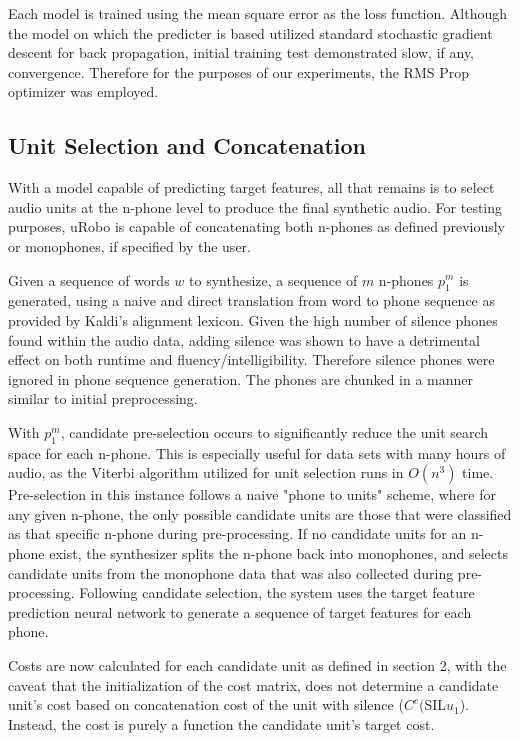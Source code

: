 \documentclass[10pt, journal, compsoc]{IEEEtran}
\begin{document}
Each model is trained using the mean square error as the loss function. Although the model on which the predicter is based utilized standard stochastic gradient descent\cite{unknowndnn} for back propagation, initial training test demonstrated slow, if any, convergence. Therefore for the purposes of our experiments, the RMS Prop optimizer was employed.\par
\subsection{Unit Selection and Concatenation}
With a model capable of predicting target features, all that remains is to select audio units at the n-phone level to produce the final synthetic audio. For testing purposes, uRobo is capable of concatenating both n-phones as defined previously or monophones, if specified by the user.\par 
Given a sequence of words $w$ to synthesize, a sequence of $m$ n-phones $p_1^m$ is generated, using a naive and direct translation from word to phone sequence as provided by Kaldi's alignment lexicon. Given the high number of silence phones found within the audio data, adding silence was shown to have a detrimental effect on both runtime and fluency/intelligibility. Therefore silence phones were ignored in phone sequence generation. The phones are chunked in a manner similar to initial preprocessing.\par 
With $p_1^m$, candidate pre-selection occurs to significantly reduce the unit search space for each n-phone. This is especially useful for data sets with many hours of audio, as the Viterbi algorithm utilized for unit selection runs in $O(n^3)$ time. Pre-selection in this instance follows a naive "phone to units" scheme, where for any given n-phone, the only possible candidate units are those that were classified as that specific n-phone during pre-processing. If no candidate units for an n-phone exist, the synthesizer splits the n-phone back into monophones, and selects candidate units from the monophone data that was also collected during pre-processing. Following candidate selection, the system uses the target feature prediction neural network to generate a sequence of target features for each phone.\par 
Costs are now calculated for each candidate unit as defined in section 2, with the caveat that the initialization of the cost matrix, does not determine a candidate unit's cost based on concatenation cost of the unit with silence ($C^c($SIL$u_1$). Instead, the cost is purely a function the candidate unit's target cost.\par
\end{document}
